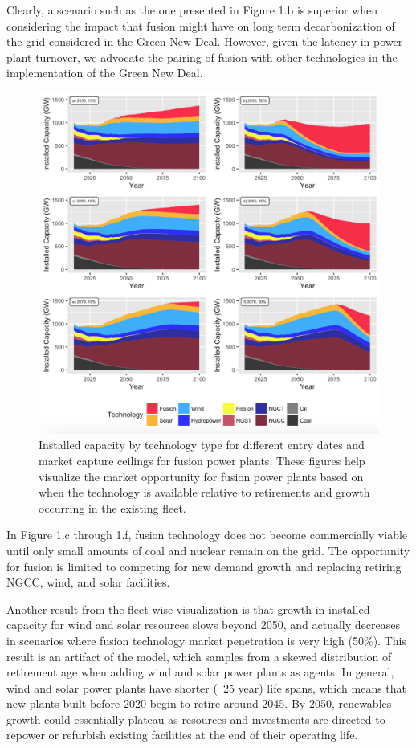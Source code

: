 \documentclass[review]{elsarticle}
\begin{document}
Clearly, a scenario such as the one presented in Figure 1.b is superior when considering the impact that fusion might have on long term decarbonization of the grid considered in the Green New Deal. However, given the latency in power plant turnover, we advocate the pairing of fusion with other technologies in the implementation of the Green New Deal.

\begin{figure}
\begin{center}
\includegraphics[width=\textwidth]{mainFig.png}
\end{center}
\caption{Installed capacity by technology type for different entry dates and market capture ceilings for fusion power plants. These figures help visualize the market opportunity for fusion power plants based on when the technology is available relative to retirements and growth occurring in the existing fleet.}
\end{figure}

In Figure 1.c through 1.f, fusion technology does not become commercially viable until only small amounts of coal and nuclear remain on the grid. The opportunity for fusion is limited to competing for new demand growth and replacing retiring NGCC, wind, and solar facilities. 

Another result from the fleet-wise visualization is that growth in installed capacity for wind and solar resources slows beyond 2050, and actually decreases in scenarios where fusion technology market penetration is very high (50\%). This result is an artifact of the model, which samples from a skewed distribution of retirement age when adding wind and solar power plants as agents. In general, wind and solar power plants have shorter (~25 year) life spans, which means that new plants built before 2020 begin to retire around 2045. By 2050, renewables growth could essentially plateau as resources and investments are directed to repower or refurbish existing facilities at the end of their operating life.
\end{document}
